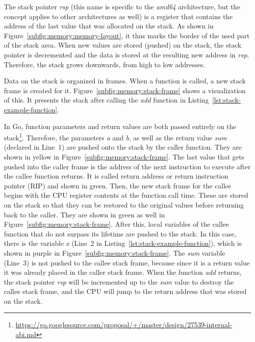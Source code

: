 The stack pointer \textit{rsp} (this name is specific to the \textit{amd64} architecture, but the concept applies to
other architectures as well) is a register that contains the address of the last value that was allocated on the stack.
As shown in Figure~\ref{subfig:memory:memory-layout}, it thus marks the border of the used part of the stack area.
When new values are stored (pushed) on the stack, the stack pointer is decremented and the data is stored at the
resulting new address in \textit{rsp}.
Therefore, the stack grows downwards, from high to low addresses.

Data on the stack is organized in frames.
When a function is called, a new stack frame is created for it.
Figure~\ref{subfig:memory:stack-frame} shows a visualization of this.
It presents the stack after calling the \textit{add} function in Listing~\ref{lst:stack-example-function}.



In Go, function parameters and return values are both passed entirely on the
stack\footnote{\url{https://go.googlesource.com/proposal/+/master/design/27539-internal-abi.md}}.
Therefore, the parameters \textit{a} and \textit{b}, as well as the return value \textit{sum} (declared in Line~1) are
pushed onto the stack by the caller function.
They are shown in yellow in Figure~\ref{subfig:memory:stack-frame}.
The last value that gets pushed into the caller frame is the address of the next instruction to execute after the callee
function returns.
It is called return address or return instruction pointer (\acrshort{RIP}) and shown in green.
Then, the new stack frame for the callee begins with the \acrshort{CPU} register contents at the function call time.
These are stored on the stack so that they can be restored to the original values before returning back to the caller.
They are shown in green as well in Figure~\ref{subfig:memory:stack-frame}.
After this, local variables of the callee function that do not surpass its lifetime are pushed to the stack.
In this case, there is the variable \textit{x} (Line~2 in Listing~\ref{lst:stack-example-function}), which is shown in
purple in Figure~\ref{subfig:memory:stack-frame}.
The \textit{sum} variable (Line~3) is not pushed to the callee stack frame, because since it is a return value it was
already placed in the caller stack frame.
When the function \textit{add} returns, the stack pointer \textit{rsp} will be incremented up to the \textit{sum} value
to destroy the callee stack frame, and the \acrshort{CPU} will jump to the return address that was stored on the stack.

